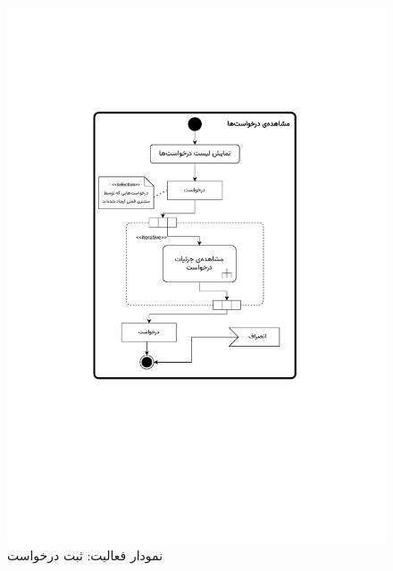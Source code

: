 \begin{figure}
	\centering
	\includegraphics[scale=0.8, page=9]{figs/OOD-activity11-20.pdf}
	\caption{نمودار فعالیت: ثبت درخواست}
\end{figure}
\FloatBarrier
\newpage


